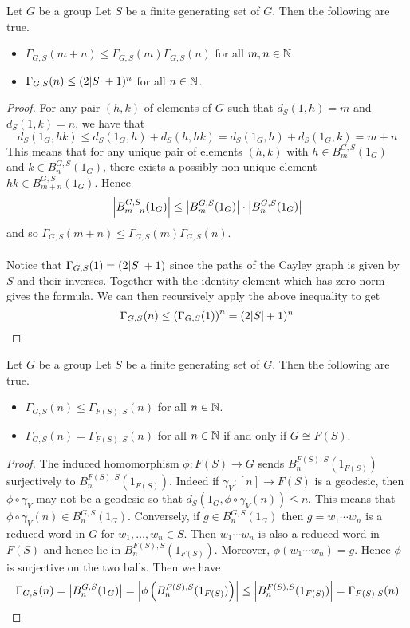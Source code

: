\documentclass[a4paper]{article}
\begin{document}
\begin{prp}{}{} Let $G$ be a group Let $S$ be a finite generating set of $G$. Then the following are true. 
\begin{itemize}
\item $\Gamma_{G,S}(m+n)\leq\Gamma_{G,S}(m)\Gamma_{G,S}(n)$ for all $m,n\in\mathbb{N}$
\item $\Gamma_{G,S}(n)\leq(2\abs{S}+1)^n$ for all $n\in\mathbb{N}$. 
\end{itemize} \tcbline
\begin{proof}
For any pair $(h,k)$ of elements of $G$ such that $d_S(1,h)=m$ and $d_S(1,k)=n$, we have that $$d_S(1_G,hk)\leq d_S(1_G,h)+d_S(h,hk)=d_S(1_G,h)+d_S(1_G,k)=m+n$$ This means that for any unique pair of elements $(h,k)$ with $h\in B_m^{G,S}(1_G)$ and $k\in B_n^{G,S}(1_G)$, there exists a possibly non-unique element $hk\in B_{m+n}^{G,S}(1_G)$. Hence $$\abs{B_{m+n}^{G,S}(1_G)}\leq\abs{B_m^{G,S}(1_G)}\cdot\abs{B_n^{G,S}(1_G)}$$ and so $\Gamma_{G,S}(m+n)\leq\Gamma_{G,S}(m)\Gamma_{G,S}(n)$. \\~\\

Notice that $\Gamma_{G,S}(1)=(2\abs{S}+1)$ since the paths of the Cayley graph is given by $S$ and their inverses. Together with the identity element which has zero norm gives the formula. We can then recursively apply the above inequality to get $$\Gamma_{G,S}(n)\leq\left(\Gamma_{G,S}(1)\right)^n=(2\abs{S}+1)^n$$
\end{proof}
\end{prp}

\begin{lmm}{}{} Let $G$ be a group Let $S$ be a finite generating set of $G$. Then the following are true. 
\begin{itemize}
\item $\Gamma_{G,S}(n)\leq\Gamma_{F(S),S}(n)$ for all $n\in\mathbb{N}$. 
\item $\Gamma_{G,S}(n)=\Gamma_{F(S),S}(n)$ for all $n\in\mathbb{N}$ if and only if $G\cong F(S)$. 
\end{itemize} \tcbline
\begin{proof}
The induced homomorphism $\phi:F(S)\to G$ sends $B_n^{F(S),S}(1_{F(S)})$ surjectively to $B_n^{F(S),S}(1_{F(S)})$. Indeed if $\gamma_V:[n]\to F(S)$ is a geodesic, then $\phi\circ\gamma_V$ may not be a geodesic so that $d_S(1_G,\phi\circ\gamma_V(n))\leq n$. This means that $\phi\circ\gamma_V(n)\in B_n^{G,S}(1_G)$. Conversely, if $g\in B_n^{G,S}(1_G)$ then $g=w_1\cdots w_n$ is a reduced word in $G$ for $w_1,\dots,w_n\in S$. Then $w_1\cdots w_n$ is also a reduced word in $F(S)$ and hence lie in $B_n^{F(S),S}(1_{F(S)})$. Moreover, $\phi(w_1\cdots w_n)=g$. Hence $\phi$ is surjective on the two balls. Then we have $$\Gamma_{G,S}(n)=\abs{B_n^{G,S}(1_G)}=\abs{\phi\left(B_n^{F(S),S}(1_{F(S)})\right)}\leq\abs{B_n^{F(S),S}(1_{F(S)})}=\Gamma_{F(S),S}(n)$$
\end{proof}
\end{lmm}
\end{document}
